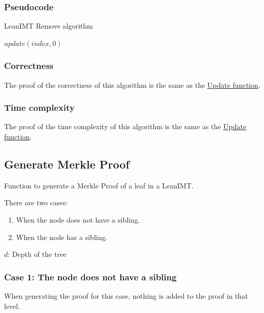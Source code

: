 \documentclass{article}
\begin{document}
\subsubsection{Pseudocode}

\begin{algorithm}[H]
    \caption{LeanIMT Remove algorithm}\label{remove}
    \begin{algorithmic}[1]
        \State $update(index, 0)$
        \EndProcedure
    \end{algorithmic}
\end{algorithm}



\subsubsection{Correctness}

The proof of the correctness of this algorithm is the same as the \hyperref[sec:update-correctness]{Update function}.

\subsubsection{Time complexity}

The proof of the time complexity of this algorithm is the same as the \hyperref[sec:update-time-complexity]{Update function}.

\subsection{Generate Merkle Proof}

Function to generate a Merkle Proof of a leaf in a LeanIMT.

There are two cases:

\begin{enumerate}
    \item When the node does not have a sibling.
    \item When the node has a sibling.
\end{enumerate}

$d$: Depth of the tree

\subsubsection*{Case 1: The node does not have a sibling}

When generating the proof for this case, nothing is added to the proof in that level.
\end{document}

